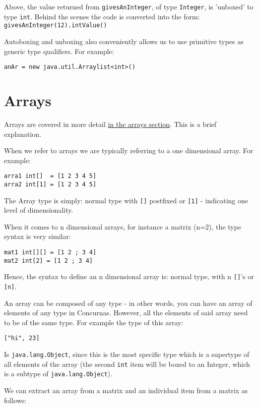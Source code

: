 \documentclass[conc-doc]{subfiles}
\begin{document}
Above, the value returned from \lstinline{givesAnInteger}, of type \lstinline{Integer}, is 'unboxed' to type \lstinline{int}. Behind the scenes the code is converted into the form: \lstinline{givesAnInteger(12).intValue()}

Autoboxing and unboxing also conveniently allows us to use primitive types as generic type qualifiers. For example:
\begin{lstlisting}
anAr = new java.util.Arraylist<int>()
\end{lstlisting}

\section{Arrays}
Arrays are covered in more detail \hyperref[ch:arrays]{in the arrays section}. This is a brief explanation.

When we refer to arrays we are typically referring to a one dimensional array. For example:

\begin{lstlisting}
arra1 int[]  = [1 2 3 4 5]
arra2 int[1] = [1 2 3 4 5]
\end{lstlisting}

The Array type is simply: normal type with \lstinline{[]} postfixed or \lstinline{[1]} - indicating one level of dimensionality.

When it comes to n dimensional arrays, for instance a matrix (n=2), the type syntax is very similar: 
\begin{lstlisting}
mat1 int[][] = [1 2 ; 3 4]
mat2 int[2] = [1 2 ; 3 4]
\end{lstlisting}

Hence, the syntax to define an n dimensional array is: normal type, with n \lstinline{[]}'s or \lstinline{[n]}.

An array can be composed of any type - in other words, you can have an array of elements of any type in Concurnas. However, all the elements of said array need to be of the same type. For example the type of this array:

\begin{lstlisting}
["hi", 23]
\end{lstlisting}

Is \lstinline{java.lang.Object}, since this is the most specific type which is a supertype of all elements of the array (the second \lstinline{int} item will be boxed to an Integer, which is a subtype of \lstinline{java.lang.Object}).

We can extract an array from a matrix and an individual item from a matrix as follows:
\end{document}
